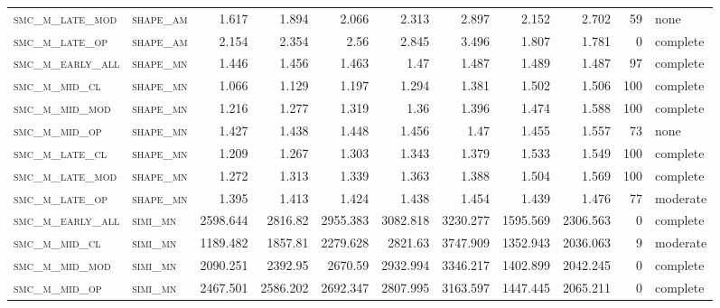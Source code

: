 \begin{landscape}
\begin{center}
\begin{footnotesize}
\begin{longtable}{llrrrrr|rrr}
\textsc{smc\_m\_late\_mod } & \textsc{shape\_am }   & 1.617    & 1.894    & 2.066    & 2.313    & 2.897    & 2.152       & 2.702         & 59            & none \\
\textsc{smc\_m\_late\_op  } & \textsc{shape\_am }   & 2.154    & 2.354    & 2.56     & 2.845    & 3.496    & 1.807       & 1.781         & 0             & complete     \\
\textsc{smc\_m\_early\_all} & \textsc{shape\_mn }   & 1.446    & 1.456    & 1.463    & 1.47     & 1.487    & 1.489       & 1.487         & 97            & complete \\
\textsc{smc\_m\_mid\_cl   } & \textsc{shape\_mn }   & 1.066    & 1.129    & 1.197    & 1.294    & 1.381    & 1.502       & 1.506         & 100           & complete \\
\textsc{smc\_m\_mid\_mod  } & \textsc{shape\_mn }   & 1.216    & 1.277    & 1.319    & 1.36     & 1.396    & 1.474       & 1.588         & 100           & complete \\
\textsc{smc\_m\_mid\_op   } & \textsc{shape\_mn }   & 1.427    & 1.438    & 1.448    & 1.456    & 1.47     & 1.455       & 1.557         & 73            & none \\
\textsc{smc\_m\_late\_cl  } & \textsc{shape\_mn }   & 1.209    & 1.267    & 1.303    & 1.343    & 1.379    & 1.533       & 1.549         & 100           & complete \\
\textsc{smc\_m\_late\_mod } & \textsc{shape\_mn }   & 1.272    & 1.313    & 1.339    & 1.363    & 1.388    & 1.504       & 1.569         & 100           & complete \\
\textsc{smc\_m\_late\_op  } & \textsc{shape\_mn }   & 1.395    & 1.413    & 1.424    & 1.438    & 1.454    & 1.439       & 1.476         & 77            & moderate \\
\textsc{smc\_m\_early\_all} & \textsc{simi\_mn  }   & 2598.644 & 2816.82  & 2955.383 & 3082.818 & 3230.277 & 1595.569    & 2306.563      & 0             & complete     \\
\textsc{smc\_m\_mid\_cl   } & \textsc{simi\_mn  }   & 1189.482 & 1857.81  & 2279.628 & 2821.63  & 3747.909 & 1352.943    & 2036.063      & 9             & moderate \\
\textsc{smc\_m\_mid\_mod  } & \textsc{simi\_mn  }   & 2090.251 & 2392.95  & 2670.59  & 2932.994 & 3346.217 & 1402.899    & 2042.245      & 0             & complete     \\
\textsc{smc\_m\_mid\_op   } & \textsc{simi\_mn  }   & 2467.501 & 2586.202 & 2692.347 & 2807.995 & 3163.597 & 1447.445    & 2065.211      & 0             & complete     \\

\end{longtable}
\end{footnotesize}
\end{center}
\end{landscape}
